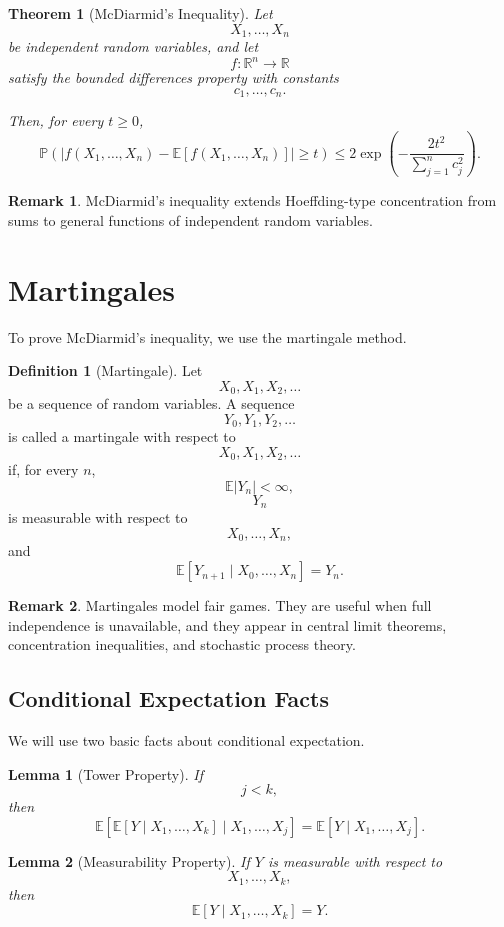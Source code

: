\documentclass[12pt,oneside]{book}
\numberwithin{equation}{section}
\theoremstyle{definition}
\newtheorem{definition}{Definition}[section]
\newtheorem{remark}{Remark}[section]
\theoremstyle{plain}
\newtheorem{theorem}{Theorem}[section]
\newtheorem{lemma}{Lemma}[section]
\theoremstyle{remark}
\newcommand{\R}{\mathbb{R}}
\newcommand{\E}{\mathbb{E}}
\newcommand{\Prob}{\mathbb{P}}
\begin{document}
\begin{theorem}[McDiarmid's Inequality]
Let
\[
X_1,\dots,X_n
\]
be independent random variables, and let
\[
f:\R^n\to\R
\]
satisfy the bounded differences property with constants
\[
c_1,\dots,c_n.
\]

Then, for every $t\geq0$,
\[
\Prob\left(
\left|
f(X_1,\dots,X_n)
-
\E[f(X_1,\dots,X_n)]
\right|
\geq t
\right)
\leq
2\exp\left(
-\frac{2t^2}{\sum_{j=1}^n c_j^2}
\right).
\]
\end{theorem}

\begin{remark}
McDiarmid's inequality extends Hoeffding-type concentration from sums to general functions of independent random variables.
\end{remark}

\section{Martingales}

To prove McDiarmid's inequality, we use the martingale method.

\begin{definition}[Martingale]
Let
\[
X_0,X_1,X_2,\dots
\]
be a sequence of random variables. A sequence
\[
Y_0,Y_1,Y_2,\dots
\]
is called a martingale with respect to
\[
X_0,X_1,X_2,\dots
\]
if, for every $n$,
\[
\E|Y_n|<\infty,
\]
\[
Y_n
\]
is measurable with respect to
\[
X_0,\dots,X_n,
\]
and
\[
\E[Y_{n+1}\mid X_0,\dots,X_n]
=
Y_n.
\]
\end{definition}

\begin{remark}
Martingales model fair games. They are useful when full independence is unavailable, and they appear in central limit theorems, concentration inequalities, and stochastic process theory.
\end{remark}

\subsection{Conditional Expectation Facts}

We will use two basic facts about conditional expectation.

\begin{lemma}[Tower Property]
If
\[
j<k,
\]
then
\[
\E\left[
\E[Y\mid X_1,\dots,X_k]
\mid X_1,\dots,X_j
\right]
=
\E[Y\mid X_1,\dots,X_j].
\]
\end{lemma}

\begin{lemma}[Measurability Property]
If $Y$ is measurable with respect to
\[
X_1,\dots,X_k,
\]
then
\[
\E[Y\mid X_1,\dots,X_k]
=
Y.
\]
\end{lemma}
\end{document}

